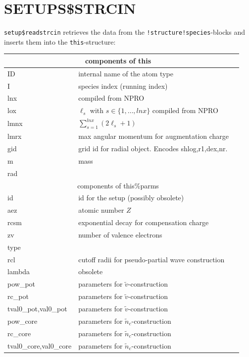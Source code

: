 \documentclass[11pt,a4paper]{report}
\begin{document}
\section{SETUPS\$STRCIN}
\verb|setup$readstrcin| retrieves the data from the
  \verb|!structure!species|-blocks and inserts them into the
  \verb|this|-structure:
\begin{center}
\begin{tabular}{|l|l|l|}
\hline
\multicolumn{2}{|c|}{components of this}\\
\hline
ID     &  internal name of the atom type\\
I      &  species index (running index)\\
lnx    &  compiled from NPRO \\
lox    & $\ell_s$ with $s\in\{1,\ldots,lnx\}$ compiled from NPRO \\
lmnx   & $\sum_{s=1}^{lnx} (2\ell_s+1)$\\
lmrx   & max angular momentum for augmentation charge\\
gid    & grid id for radial object. Encodes shlog,r1,dex,nr.\\
m      & mass\\
rad    & \\
\hline
\multicolumn{2}{|c|}{components of this\%parms}\\
\hline
id     & id for the setup (possibly obsolete)\\
aez    & atomic number $Z$\\
rcsm   & exponential decay for compensation charge\\
zv     & number of valence electrons \\
type   &\\
rcl    & cutoff radii for pseudo-partial wave construction\\
lambda & obsolete \\
\hline
pow\_pot & parameters for $\tilde{v}$-construction\\
rc\_pot & parameters for $\tilde{v}$-construction\\
tval0\_pot,val0\_pot & parameters for $\tilde{v}$-construction\\
\hline
pow\_core &parameters for $\tilde{n}_c$-construction\\
rc\_core &parameters for $\tilde{n}_c$-construction\\
tval0\_core,val0\_core &parameters for $\tilde{n}_c$-construction\\
\hline
\end{tabular}
\end{center}
\end{document}
